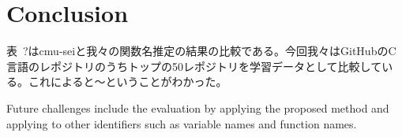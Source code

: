 \documentclass[JIP]{apris}
\begin{document}
\section{Conclusion}
表~?はcmu-seiと我々の関数名推定の結果の比較である。今回我々はGitHubのC言語のレポジトリのうちトップの50レポジトリを学習データとして比較している。これによると〜ということがわかった。

Future challenges include the evaluation by applying the proposed method and applying to other identifiers such as variable names and function names.






\end{document}
